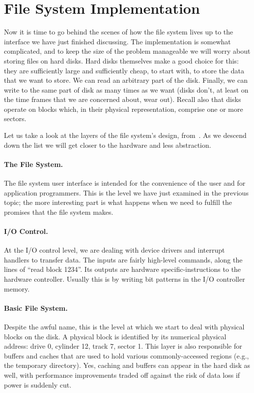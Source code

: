 




\section*{File System Implementation}
Now it is time to go behind the scenes of how the file system lives up to the interface we have just finished discussing. The implementation is somewhat complicated, and to keep the size of the problem manageable we will worry about storing files on hard disks. Hard disks themselves make a good choice for this: they are sufficiently large and sufficiently cheap, to start with, to store the data that we want to store. We can read an arbitrary part of the disk. Finally, we can write to the same part of disk as many times as we want (disks don't, at least on the time frames that we are concerned about, wear out). Recall also that disks operate on blocks which, in their physical representation, comprise one or more sectors.

Let us take a look at the layers of the file system's design, from~\cite{osc}. As we descend down the list we will get closer to the hardware and less abstraction.

\paragraph{The File System.} The file system user interface is intended for the convenience of the user and for application programmers. This is the level we have just examined in the previous topic; the more interesting part is what happens when we need to fulfill the promises that the file system makes.

\paragraph{I/O Control.} At the I/O control level, we are dealing with device drivers and interrupt handlers to transfer data. The inputs are fairly high-level commands, along the lines of ``read block 1234''. Its outputs are hardware specific-instructions to the hardware controller. Usually this is by writing bit patterns in the I/O controller memory.

\paragraph{Basic File System.} Despite the awful name, this is the level at which we start to deal with physical blocks on the disk. A physical block is identified by its numerical physical address: drive 0, cylinder 12, track 7, sector 1. This layer is also responsible for buffers and caches that are used to hold various commonly-accessed regions (e.g., the temporary directory). Yes, caching and buffers can appear in the hard disk as well, with performance improvements traded off against the risk of data loss if power is suddenly cut.

